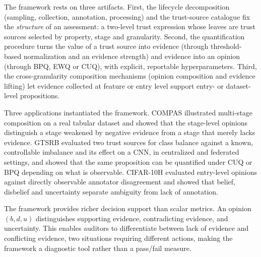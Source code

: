 The framework rests on three artifacts. First, the lifecycle decomposition (sampling, collection, annotation, processing) and the trust-source catalogue fix the \emph{structure} of an assessment: a two-level trust expression whose leaves are trust sources selected by property, stage and granularity. Second, the quantification procedure turns the value of a trust source into evidence (through threshold-based normalization and an evidence strength) and evidence into an opinion (through \ac{BPQ}, \ac{EWQ} or \ac{CUQ}), with explicit, reportable hyperparameters. Third, the cross-granularity composition mechanisms (opinion composition and evidence lifting) let evidence collected at feature or entry level support entry- or dataset-level propositions.

Three applications instantiated the framework. \ac{COMPAS} illustrated multi-stage composition on a real tabular dataset and showed that the stage-level opinions distinguish a stage weakened by negative evidence from a stage that merely lacks evidence. \ac{GTSRB} evaluated two trust sources for class balance against a known, controllable imbalance and its effect on a \ac{CNN}, in centralized and federated settings, and showed that the same proposition can be quantified under \ac{CUQ} or \ac{BPQ} depending on what is observable. CIFAR-10H evaluated entry-level opinions against directly observable annotator disagreement and showed that belief, disbelief and uncertainty separate ambiguity from lack of annotation.

The framework provides richer decision support than scalar metrics. An opinion $(b, d, u)$ distinguishes supporting evidence, contradicting evidence, and uncertainty. This enables auditors to differentiate between lack of evidence and conflicting evidence, two situations requiring different actions, making the framework a diagnostic tool rather than a pass/fail measure.

